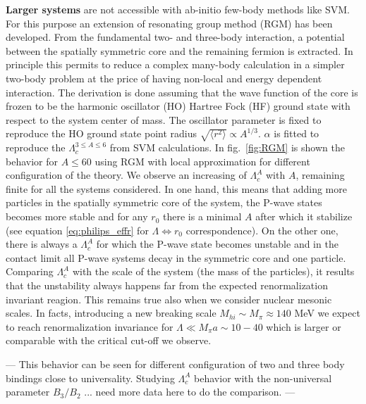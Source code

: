 \documentclass[preprint,12pt]{elsarticle}
\newcommand{\figref}[1]{fig.~\ref{#1}}
\begin{document}
\textbf{Larger systems} are not accessible with ab-initio few-body methods like SVM. 
For this purpose an extension of resonating group method (RGM) \cite{PhysRev.52.1083,Naidon_2016} has been developed.
From the fundamental two- and three-body interaction, a potential between the spatially symmetric core and the remaining fermion is extracted. 
In principle this permits to reduce a complex many-body calculation in a simpler two-body problem at the price of having non-local and energy dependent interaction.
The derivation is done assuming that the wave function of the core is frozen to be the harmonic oscillator (HO) Hartree Fock (HF) ground state with respect to the system center of mass.
The oscillator parameter is fixed to reproduce the HO ground state point radius $\sqrt{\langle r^2 \rangle} \propto A^{1/3}$.
$\alpha$ is fitted to reproduce the $\Lambda_c^{3\le A \le 6}$ from SVM calculations.
In \figref{fig:RGM} is shown the behavior for $A \le 60$ using RGM with local approximation for different configuration of the theory. 
We observe an increasing of $\Lambda_c^A$ with $A$, remaining finite for all the systems considered.
In one hand, this means that adding more particles in the spatially symmetric core of the system, the P-wave states becomes more stable and for any $r_0$ there is a minimal $A$ after which it stabilize (see equation \ref{eq:philips_effr} for $\Lambda\Leftrightarrow r_0$ correspondence).
On the other one, there is always a $\Lambda_c^A$ for which the P-wave state becomes unstable and in the contact limit all P-wave systems decay in the symmetric core and one particle.
Comparing  $\Lambda_c^A$  with the scale of the system (the mass of the particles), it results that the unstability always happens far from the expected renormalization invariant reagion.
This remains true also when we consider nuclear mesonic scales.
In facts, introducing a new breaking scale $M_{hi}\sim M_{\pi}\approx 140$ MeV we expect to reach renormalization invariance for $\Lambda\ll M_{\pi} a \sim 10-40$ which is larger or comparable with the critical cut-off we observe.

--- This behavior can be seen for different configuration of two and three body bindings close to universality.
Studying $\Lambda_c^A$ behavior with the non-universal parameter $B_3/B_2$ ... need more data here to do the comparison. ---
\end{document}
